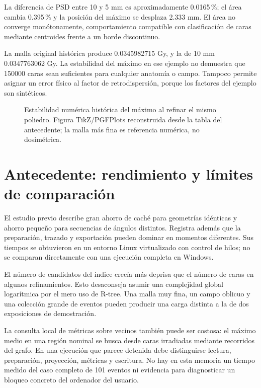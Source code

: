 La diferencia de PSD entre 10 y 5 mm es aproximadamente \num{0.0165}\,\%; el área cambia \num{0.395}\,\% y la posición del máximo se desplaza \num{2.333} mm. El área no converge monótonamente, comportamiento compatible con clasificación de caras mediante centroides frente a un borde discontinuo.

La malla original histórica produce \num{0.0345982715} Gy, y la de 10 mm \num{0.0347763062} Gy. La estabilidad del máximo en ese ejemplo no demuestra que \num{150000} caras sean suficientes para cualquier anatomía o campo. Tampoco permite asignar un error físico al factor de retrodispersión, porque los factores del ejemplo son sintéticos.

\begin{figure}[htbp]\centering

\caption{Estabilidad numérica histórica del máximo al refinar el mismo poliedro. Figura TikZ/PGFPlots reconstruida desde la tabla del antecedente; la malla más fina es referencia numérica, no dosimétrica.}
\end{figure}

\section{Antecedente: rendimiento y límites de comparación}
El estudio previo describe gran ahorro de caché para geometrías idénticas y ahorro pequeño para secuencias de ángulos distintos. Registra además que la preparación, trazado y exportación pueden dominar en momentos diferentes. Sus tiempos se obtuvieron en un entorno Linux virtualizado con control de hilos; no se comparan directamente con una ejecución completa en Windows.

El número de candidatos del índice crecía más deprisa que el número de caras en algunos refinamientos. Esto desaconseja asumir una complejidad global logarítmica por el mero uso de R-tree. Una malla muy fina, un campo oblicuo y una colección grande de eventos pueden producir una carga distinta a la de dos exposiciones de demostración.

La consulta local de métricas sobre vecinos también puede ser costosa: el máximo medio en una región nominal se busca desde caras irradiadas mediante recorridos del grafo. En una ejecución que parece detenida debe distinguirse lectura, preparación, proyección, métricas y escritura. No hay en esta memoria un tiempo medido del caso completo de 101 eventos ni evidencia para diagnosticar un bloqueo concreto del ordenador del usuario.

